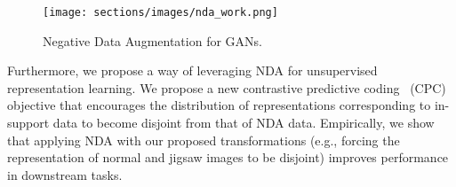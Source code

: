 \documentclass{article} \usepackage{iclr2021_conference,times}
\newcommand{\burak}[1]{ \color{red} [Burak: #1] \color{black}}
\begin{document}
\begin{wrapfigure}{r}{0.33\textwidth}
\vspace{-12pt}
  \begin{center}
    \texttt{[image: sections/images/nda\_work.png]}
  \end{center}
  \vspace{-10pt}
  \caption{Negative Data Augmentation for GANs.}
  \vspace{-13pt}
  \label{fig:NDA_fwork}
\end{wrapfigure}

Furthermore, we propose a way of leveraging NDA for unsupervised representation learning. We propose a new contrastive predictive coding~\citep{he2019momentum,han2019video} (CPC) objective that encourages the distribution of representations corresponding to in-support data to become disjoint from that of NDA data.  
Empirically, we show that applying NDA with our proposed transformations (e.g., forcing the representation of normal and jigsaw images to be disjoint)
improves performance in downstream tasks.



\begin{comment}
Building on this intuition, we apply NDA to generative modeling and contrastive representation learning. 
In adversarial generative models, there is a need to generalize beyond the empirical distribution~\citep{zhao2018bias}, which is only determined implicitly by the model architecture. By explicitly providing NDA samples as an additional source of fake data to the discriminator, we are able to regularize the generator such that it avoids undesirable samples, thus improving the overall generation quality. 
Theoretically, we can show that if the NDA assumption  
is valid, 
optimizing this objective will still recover the data distribution in the limit of infinite data and computational resources. 
In contrastive representation learning, the objective regularizes the representations of samples in the dataset, but not that of samples out of the dataset. This may lead to undesired cases such as the representation of a data is very close to another representation that is not from the dataset.
We introduce NDA in order to alleviate this issue, where we encourage the representations of data in the dataset to be far from that of NDA samples. \burak{I am having difficulty understanding the last two sentences.}


\end{comment}
\end{document}

